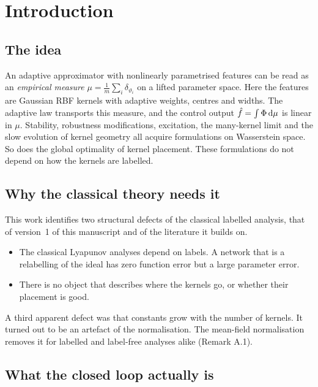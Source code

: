 
\section{Introduction}\label{sec:intro}

\subsection{The idea}

An adaptive approximator with nonlinearly parametrised features can be read as an \emph{empirical measure}
$\mu = \frac1m\sum_i\delta_{\vartheta_i}$ on a lifted parameter space. Here the features are Gaussian RBF kernels
with adaptive weights, centres and widths. The adaptive law transports this measure, and the control output
$\hat f = \int\Phi\,\mathrm{d}\mu$ is linear in $\mu$. Stability, robustness modifications, excitation, the many-kernel limit
and the slow evolution of kernel geometry all acquire formulations on Wasserstein space. So does the global
optimality of kernel placement. These formulations do not depend on how the kernels are labelled.

\subsection{Why the classical theory needs it}\label{sec:front:defects}

This work identifies two structural defects of the classical labelled analysis, that of version~1 of this manuscript
and of the literature it builds on.
\begin{itemize}
  \item The classical Lyapunov analyses depend on labels. A network that is a relabelling of the ideal has zero
    function error but a large parameter error.
  \item There is no object that describes where the kernels go, or whether their placement is good.
\end{itemize}
A third apparent defect was that constants grow with the number of kernels. It turned out to be an artefact of the
normalisation. The mean-field normalisation removes it for labelled and label-free analyses alike (Remark A.1).

\subsection{What the closed loop actually is}

